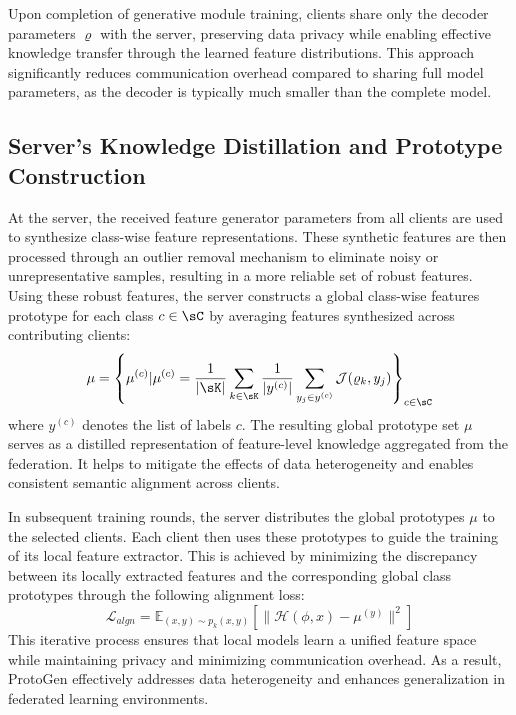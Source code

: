 \documentclass[lettersize,journal]{IEEEtran}
\begin{document}
Upon completion of generative module training, clients share only the decoder parameters $\varrho$ with the server, preserving data privacy while enabling effective knowledge transfer through the learned feature distributions. This approach significantly reduces communication overhead compared to sharing full model parameters, as the decoder is typically much smaller than the complete model.

\subsection{Server's Knowledge Distillation and Prototype Construction}
At the server, the received feature generator parameters from all clients are used to synthesize class-wise feature representations. These synthetic features are then processed through an outlier removal mechanism to eliminate noisy or unrepresentative samples, resulting in a more reliable set of robust features. Using these robust features, the server constructs a global class-wise features prototype for each class $c\in \sC$ by averaging features synthesized across contributing clients:
\begin{equation}
\label{eq:global_proto}
\mu = \left\{\mu^{(c)} | \mu^{(c)} = \frac{1}{|\sK|} \sum_{k \in \sK}  \frac{1}{|y^{(c)}|}\sum_{y_j\in y^{(c)}}\mathcal{J}(\varrho_k, y_j) \right\}_{c\in \sC}    
\end{equation}
where $y^{(c)}$ denotes the list of labels $c$. 
The resulting global prototype set \(\mu\) serves as a distilled representation of feature-level knowledge aggregated from the federation. It helps to mitigate the effects of data heterogeneity and enables consistent semantic alignment across clients.

In subsequent training rounds, the server distributes the global prototypes \(\mu\) to the selected clients. Each client then uses these prototypes to guide the training of its local feature extractor. This is achieved by minimizing the discrepancy between its locally extracted features and the corresponding global class prototypes through the following alignment loss:
\begin{equation}
    \mathcal{L}_{algn} = \mathbb{E}_{(x, y) \sim p_k(x, y)} \left[ \| \mathcal{H}(\phi, x) - \mu^{(y)} \|^2 \right]
\end{equation}
This iterative process ensures that local models learn a unified feature space while maintaining privacy and minimizing communication overhead. As a result, \textsf{ProtoGen} effectively addresses data heterogeneity and enhances generalization in federated learning environments.
\end{document}
